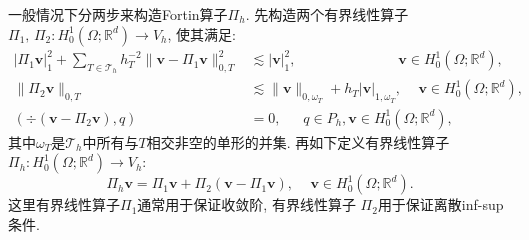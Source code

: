 一般情况下分两步来构造Fortin算子$\Pi_h$.
先构造两个有界线性算子 $\Pi_1,\, \Pi_2:H_0^{1}(\Omega; \mathbb{R}^{d})\rightarrow  V_h$, 使其满足:
 \begin{align}
|\Pi_{1}\boldsymbol{v}|_{1}^2+\sum_{T\in\mathcal T_h}h_T^{-2}\|\boldsymbol{v}-\Pi_{1}\boldsymbol{v}\|_{0,T}^2 &\lesssim |\boldsymbol{v}|_1^2, \qquad\quad\qquad\qquad\; \boldsymbol{v}\in H_0^{1}(\Omega; \mathbb{R}^{d}), \label{fortin:pi1}\\
 \|\Pi_2\boldsymbol{v} \|_{0,T}  &\lesssim\|\boldsymbol{v} \|_{0,\omega_T}+h_T|\boldsymbol{v} |_{1,\omega_T},
 \quad\, \boldsymbol{v}\in H_0^{1}(\Omega; \mathbb{R}^{d}), \label{fortin:pi21}\\
(\div(\boldsymbol{v}-\Pi_2\boldsymbol{v}),q)&=0,
\quad\;\; q\in P_{h}, \boldsymbol{v}\in H_0^{1}(\Omega; \mathbb{R}^{d}),\label{fortin:pi22}
\end{align}
其中$\omega_T$是$\mathcal T_h$中所有与$T$相交非空的单形的并集.
再如下定义有界线性算子$\Pi_{h}: H_0^{1}(\Omega; \mathbb{R}^{d})\rightarrow  V_{h}$:
\begin{equation}\label{PihPi12}
\Pi_{h}\boldsymbol{v}=\Pi_{1}\boldsymbol{v}
+\Pi_{2}(\boldsymbol{v}-\Pi_{1}\boldsymbol{v}),\quad \, \boldsymbol{v}\in H_0^{1}(\Omega; \mathbb{R}^{d}).
\end{equation}
这里有界线性算子$\Pi_{1}$通常用于保证收敛阶, 有界线性算子 $\Pi_{2}$用于保证离散inf-sup 条件.

